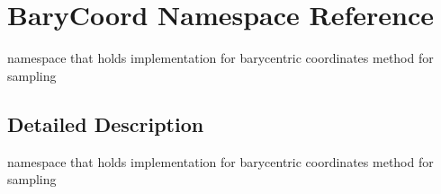 \hypertarget{namespaceBaryCoord}{}\section{Bary\+Coord Namespace Reference}
\label{namespaceBaryCoord}


namespace that holds implementation for barycentric coordinates method for sampling  




\subsection{Detailed Description}
namespace that holds implementation for barycentric coordinates method for sampling 